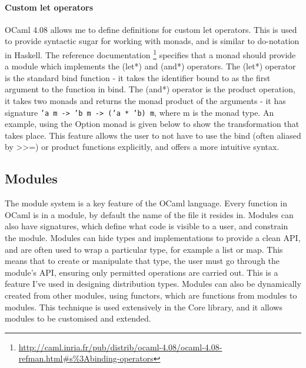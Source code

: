 \paragraph{Custom let operators}
OCaml 4.08 allows me to define definitions for custom let operators. This is used to provide syntactic sugar for working with monads, and is similar to do-notation in Haskell. The reference documentation \footnote{\url{http://caml.inria.fr/pub/distrib/ocaml-4.08/ocaml-4.08-refman.html\#s\%3Abinding-operators}} specifies that a monad should provide a module which implements the (let*) and (and*) operators. The (let*) operator is the standard bind function - it takes the identifier bound to as the first argument to the function in bind. The (and*) operator is the product operation, it takes two monads and returns the monad product of the arguments - it has signature \texttt{'a m -> 'b m -> ('a * 'b) m}, where m is the monad type. An example, using the Option monad is given below to show the transformation that takes place. This feature allows the user to not have to use the bind (often aliased by >>=) or product functions explicitly, and offers a more intuitive syntax.
			
\begin{figure}[!htb]
	\centering
	\begin{minipage}{0.45\textwidth}
		\centering
	\end{minipage}
	\begin{minipage}{0.45\textwidth}
		\centering
	\end{minipage}
\end{figure}
		
\subsection{Modules}
The module system is a key feature of the OCaml language. Every function in OCaml is in a module, by default the name of the file it resides in. Modules can also have signatures, which define what code is visible to a user, and constrain the module. Modules can hide types and implementations to provide a clean API, and are often used to wrap a particular type, for example a list or map. This means that to create or manipulate that type, the user must go through the module's API, ensuring only permitted operations are carried out. This is a feature I've used in designing distribution types. Modules can also be dynamically created from other modules, using functors, which are functions from modules to modules. This technique is used extensively in the Core library, and it allows modules to be customised and extended.
		
